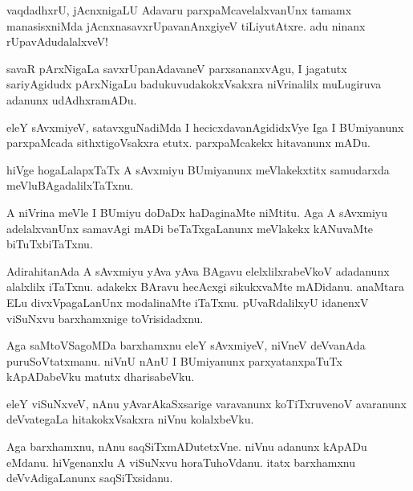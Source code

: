 \documentclass{article}
\begin{document}
\begin{mn}
vaqdadhxrU, jAcnxnigaLU Adavaru parxpaMcavelalxvanUnx tamamx
manasisxniMda jAcnxnasavxrUpavanAnxgiyeV tiLiyutAtxre. adu ninanx rUpavAdudalalxveV!
\end{mn}

\begin{mn}
savaR pArxNigaLa savxrUpanAdavaneV parxsananxvAgu, I jagatutx
sariyAgidudx pArxNigaLu badukuvudakokxVsakxra niVrinalilx muLugiruva
adanunx udAdhxramADu.
\end{mn}

\begin{mn}
eleY sAvxmiyeV, satavxguNadiMda I hecicxdavanAgididxVye Iga I
BUmiyanunx parxpaMcada sithxtigoVsakxra etutx. parxpaMcakekx
hitavanunx mADu.
\end{mn}

\begin{mn}
hiVge hogaLalapxTaTx A sAvxmiyu BUmiyanunx meVlakekxtitx samudarxda meVluBAgadalilxTaTxnu.
\end{mn}

\begin{mn}
A niVrina meVle I BUmiyu doDaDx haDaginaMte niMtitu. Aga A sAvxmiyu
adelalxvanUnx samavAgi mADi beTaTxgaLanunx meVlakekx kANuvaMte biTuTxbiTaTxnu.
\end{mn}

\begin{mn}%
AdirahitanAda A sAvxmiyu yAva yAva BAgavu elelxlilxrabeVkoV adadanunx
alalxlilx iTaTxnu. adakekx BAravu hecAcxgi sikukxvaMte
mADidanu. anaMtara ELu divxVpagaLanUnx modalinaMte
iTaTxnu. pUvaRdalilxyU idanenxV viSuNxvu barxhamxnige toVrisidadxnu.
\end{mn}

\begin{mn}
Aga saMtoVSagoMDa barxhamxnu eleY sAvxmiyeV, niVneV deVvanAda
puruSoVtatxmanu. niVnU nAnU I BUmiyanunx parxyatanxpaTuTx kApADabeVku
matutx dharisabeVku.
\end{mn}

\begin{mn}
eleY viSuNxveV, nAnu yAvarAkaSxsarige varavanunx koTiTxruvenoV
avaranunx deVvategaLa hitakokxVsakxra niVnu kolalxbeVku.
\end{mn}

\begin{mn}
Aga barxhamxnu, nAnu saqSiTxmADutetxVne. niVnu adanunx kApADu
eMdanu. hiVgenanxlu A viSuNxvu horaTuhoVdanu. itatx barxhamxnu
deVvAdigaLanunx saqSiTxsidanu.
\end{mn}
\end{document}
